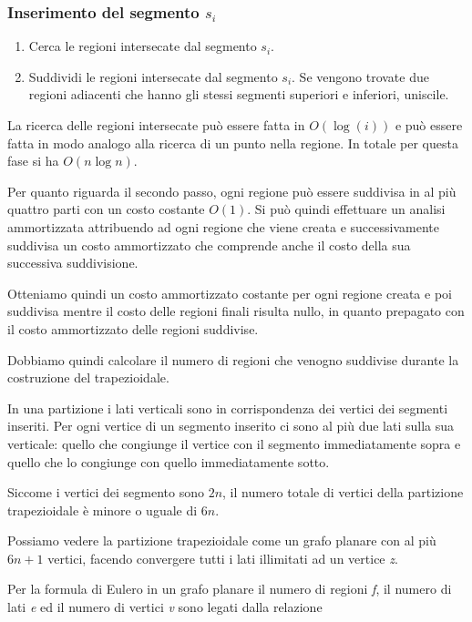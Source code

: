 \subsubsection{Inserimento del segmento $s_i$}\label{inserimento-del-segmento-si}

\begin{enumerate}
\item   Cerca le regioni intersecate dal segmento $s_i$.
\item   Suddividi le regioni intersecate dal segmento $s_i$. Se vengono trovate due regioni adiacenti che hanno gli stessi segmenti superiori e inferiori, uniscile.
\end{enumerate}

La ricerca delle regioni intersecate può essere fatta in $O(\log(i))$ e può essere fatta in modo analogo alla ricerca di un punto nella regione. In totale per questa fase si ha $O(n \log n)$.

Per quanto riguarda il secondo passo, ogni regione può essere suddivisa in al più quattro parti con un costo costante $O(1)$. 
Si può quindi effettuare un analisi ammortizzata attribuendo ad ogni regione che viene creata e successivamente suddivisa un costo ammortizzato che comprende anche il costo della sua successiva suddivisione.

Otteniamo quindi un costo ammortizzato costante per ogni regione creata e poi suddivisa mentre il costo delle regioni finali risulta nullo, in quanto prepagato con il costo ammortizzato delle regioni suddivise.

Dobbiamo quindi calcolare il numero di regioni che venogno suddivise durante la costruzione del trapezioidale.

In una partizione i lati verticali sono in corrispondenza dei vertici dei segmenti inseriti. Per ogni vertice di un segmento inserito ci sono al più due lati sulla sua verticale: quello che congiunge il vertice con il segmento immediatamente sopra e quello che lo congiunge con quello immediatamente sotto.

Siccome i vertici dei segmento sono $2n$, il numero totale di vertici della partizione trapezioidale è minore o uguale di $6n$. 

Possiamo vedere la partizione trapezioidale come un grafo planare con al più $6n+1$ vertici, facendo convergere tutti i lati illimitati ad un vertice \textit{z}.

Per la formula di Eulero in un grafo planare il numero di regioni \textit{f}, il numero di lati \textit{e} ed il numero di vertici \textit{v} sono legati dalla relazione

